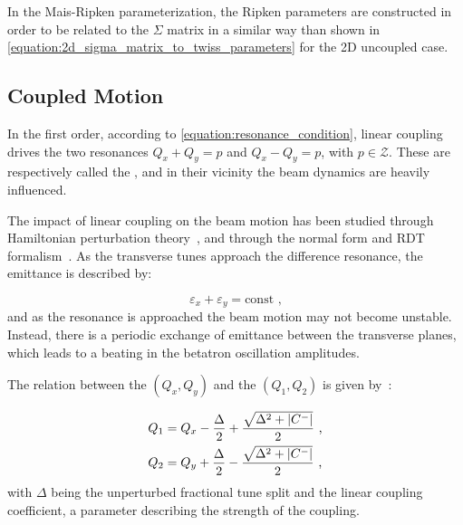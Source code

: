 In the Mais-Ripken parameterization, the Ripken parameters are constructed in order to be related to the \(\Sigma\) matrix in a similar way than shown in \cref{equation:2d_sigma_matrix_to_twiss_parameters} for the \num{2}D uncoupled case.

\subsection{Coupled Motion}
\label{subsection:coupled_motion}

In the first order, according to \cref{equation:resonance_condition}, linear coupling drives the two resonances \(Q_x + Q_y = p\) and \(Q_x - Q_y = p\), with \(p \in \mathcal{Z}\).
These are respectively called the , and in their vicinity the beam dynamics are heavily influenced.

The impact of linear coupling on the beam motion has been studied through Hamiltonian perturbation theory~\cite{PHREV:Guignard:Betatron_Coupling_Radiation,BOOK:Wiedemann:Particle_Accelerator_Physics}, and through the normal form and \gls{RDT} formalism~\cite{PHD:Franchi}.
As the transverse tunes approach the difference resonance, the emittance is described by:

\begin{equation}
    \varepsilon_x + \varepsilon_y = \mathrm{const} \text{ ,}
    \label{equation:coupled_emittances_difference_resonance}
\end{equation}
and as the resonance is approached the beam motion may not become unstable.
Instead, there is a periodic exchange of emittance between the transverse planes, which leads to a beating in the betatron oscillation amplitudes.

The relation between the  \((Q_x, Q_y)\) and the  \((Q_1, Q_2)\) is given by~\cite{CAS:Bryant:Theory_Weak_Betatron_Coupling}:

\begin{equation}
    \begin{aligned}
        Q_1 &= Q_x- \frac{\Delta}{2} + \frac{\sqrt{\Delta^2 + \left\lvert C^{-} \right\rvert}}{2} \text{ ,} \\
        Q_2 &= Q_y+ \frac{\Delta}{2} - \frac{\sqrt{\Delta^2 + \left\lvert C^{-} \right\rvert}}{2} \text{ ,}
    \end{aligned}
    \label{equation:unperturbed_tunes_to_coupled_tunes}
\end{equation}
with \(\Delta\) being the unperturbed fractional tune split and  the linear coupling coefficient, a parameter describing the strength of the coupling.

